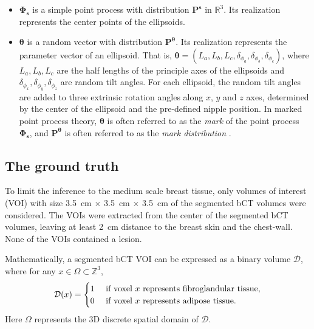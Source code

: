 \documentclass[journal]{IEEEtran}
\begin{document}
\begin{itemize}

\item $\mathbf{\Phi_s}$ is a simple point process with distribution
  $\mathbf{P}^{\mathbf{s}}$ in $\mathbb{R}^{3}$. Its realization
  represents the center points of the ellipsoids.

\item $\boldsymbol{\theta}$ is a random vector with distribution
  $\mathbf{P}^{\boldsymbol{\theta}}$. Its realization represents the
  parameter vector of an ellipsoid. That is,
  $\boldsymbol{\theta} = \left( L_a, L_b, L_c, \delta_{\phi_a},
    \delta_{\phi_b}, \delta_{\phi_c} \right)$, where $L_a, L_b, L_c$
  are the half lengths of the principle axes of the ellipsoids and
  $\delta_{\phi_{x}},\delta_{\phi_{y}},\delta_{\phi_{z}}$ are random
  tilt angles. For each ellipsoid, the random tilt angles are added to
  three extrinsic rotation angles along $x$, $y$ and $z$ axes,
  determined by the center of the ellipsoid and the pre-defined nipple
  position. In marked point process theory, $\boldsymbol{\theta}$ is
  often referred to as the \textit{mark} of the point process
  $\mathbf{\Phi_s}$, and $\mathbf{P}^{\boldsymbol{\theta}}$ is often
  referred to as the \textit{mark distribution}
  \cite{chiu2013stochastic}.
\end{itemize}

\subsection{The ground truth}
\label{sec:ground-truth}

To limit the inference to the medium scale breast tissue, only volumes
of interest (VOI) with size \SI{3.5}{\cm} $\times$ \SI{3.5}{\cm}
$\times$ \SI{3.5}{\cm} of the segmented bCT volumes were
considered. The VOIs were extracted from the center of the segmented
bCT volumes, leaving at least \SI{2}{\cm} distance to the breast skin
and the chest-wall. None of the VOIs contained a lesion.

Mathematically, a segmented bCT VOI can be expressed as a binary
volume $\mathcal{D}$, where for any
$x \in \Omega \subset \mathbb{Z}^3$,
\begin{equation}
  \label{eq:bct-discrete-form}
  \mathcal{D}(x) =
  \begin{cases}
    1 & \textnormal{ if voxel } x \textnormal{ represents
      fibroglandular tissue}, \\
    0 & \textnormal{ if voxel } x \textnormal{ represents
      adipose tissue}. \\
  \end{cases}
\end{equation}
Here $\Omega$ represents the 3D discrete spatial domain of
$\mathcal{D}$.
\end{document}
